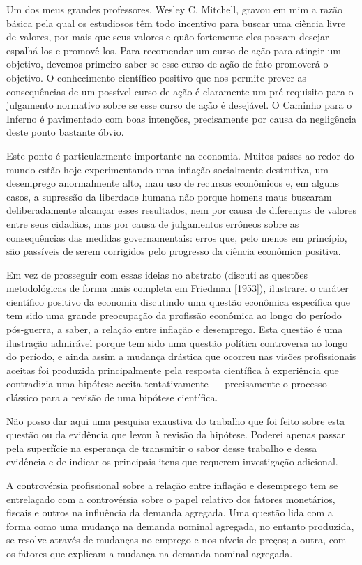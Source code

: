 \documentclass[12pt]{article}
\begin{document}
Um dos meus grandes professores, Wesley C. Mitchell, gravou em mim a razão básica pela qual os estudiosos têm todo incentivo para buscar uma ciência livre de valores, por mais que seus valores e quão fortemente eles possam desejar espalhá-los e promovê-los. Para recomendar um curso de ação para atingir um objetivo, devemos primeiro saber se esse curso de ação de fato promoverá o objetivo. O conhecimento científico positivo que nos permite prever as consequências de um possível curso de ação é claramente um pré-requisito para o julgamento normativo sobre se esse curso de ação é desejável. O Caminho para o Inferno é pavimentado com boas intenções, precisamente por causa da negligência deste ponto bastante óbvio.

Este ponto é particularmente importante na economia. Muitos países ao redor do mundo estão hoje experimentando uma inflação socialmente destrutiva, um desemprego anormalmente alto, mau uso de recursos econômicos e, em alguns casos, a supressão da liberdade humana não porque homens maus buscaram deliberadamente alcançar esses resultados, nem por causa de diferenças de valores entre seus cidadãos, mas por causa de julgamentos errôneos sobre as consequências das medidas governamentais: erros que, pelo menos em princípio, são passíveis de serem corrigidos pelo progresso da ciência econômica positiva.

Em vez de prosseguir com essas ideias no abstrato (discuti as questões metodológicas de forma mais completa em Friedman [1953]), ilustrarei o caráter científico positivo da economia discutindo uma questão econômica específica que tem sido uma grande preocupação da profissão econômica ao longo do período pós-guerra, a saber, a relação entre inflação e desemprego. Esta questão é uma ilustração admirável porque tem sido uma questão política controversa ao longo do período, e ainda assim a mudança drástica que ocorreu nas visões profissionais aceitas foi produzida principalmente pela resposta científica à experiência que contradizia uma hipótese aceita tentativamente — precisamente o processo clássico para a revisão de uma hipótese científica.

Não posso dar aqui uma pesquisa exaustiva do trabalho que foi feito sobre esta questão ou da evidência que levou à revisão da hipótese. Poderei apenas passar pela superfície na esperança de transmitir o sabor desse trabalho e dessa evidência e de indicar os principais itens que requerem investigação adicional.

A controvérsia profissional sobre a relação entre inflação e desemprego tem se entrelaçado com a controvérsia sobre o papel relativo dos fatores monetários, fiscais e outros na influência da demanda agregada. Uma questão lida com a forma como uma mudança na demanda nominal agregada, no entanto produzida, se resolve através de mudanças no emprego e nos níveis de preços; a outra, com os fatores que explicam a mudança na demanda nominal agregada.
\end{document}
